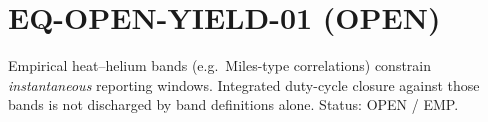 \documentclass{article}
\begin{document}
\section*{EQ-OPEN-YIELD-01 (OPEN)}
Empirical heat--helium bands (e.g.\ Miles-type correlations) constrain
\emph{instantaneous} reporting windows. Integrated duty-cycle closure against
those bands is not discharged by band definitions alone. Status: OPEN / EMP.
\end{document}
